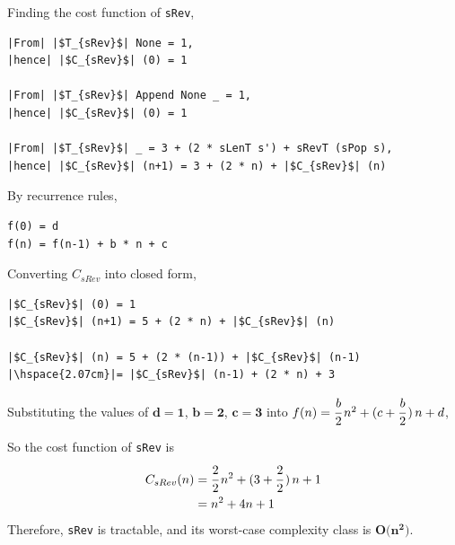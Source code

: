 \documentclass[12pt]{article}
\newcommand{\haskell}{\texttt}
\begin{document}
\bigskip Finding the cost function of \haskell{sRev},
\begin{mdframed}

\begin{verbatim}
|From| |$T_{sRev}$| None = 1, 
|hence| |$C_{sRev}$| (0) = 1

|From| |$T_{sRev}$| Append None _ = 1, 
|hence| |$C_{sRev}$| (0) = 1

|From| |$T_{sRev}$| _ = 3 + (2 * sLenT s') + sRevT (sPop s),
|hence| |$C_{sRev}$| (n+1) = 3 + (2 * n) + |$C_{sRev}$| (n)
\end{verbatim}

\bigskip By recurrence rules,
\begin{verbatim}
f(0) = d
f(n) = f(n-1) + b * n + c
\end{verbatim}

\bigskip Converting $C_{sRev}$ into closed form, 
\begin{verbatim}
|$C_{sRev}$| (0) = 1
|$C_{sRev}$| (n+1) = 5 + (2 * n) + |$C_{sRev}$| (n)

|$C_{sRev}$| (n) = 5 + (2 * (n-1)) + |$C_{sRev}$| (n-1)
|\hspace{2.07cm}|= |$C_{sRev}$| (n-1) + (2 * n) + 3

\end{verbatim}
Substituting the values of $\bm{d = 1}$, $\bm{b = 2}$, $\bm{c = 3}$ into $f(n) = \cfrac{b}{2}\,n^{2} + (c + \cfrac{b}{2}\,)\,n + d$,
\newpage\par\noindent So the cost function of \haskell{sRev} is
\setlength{\abovedisplayskip}{0pt}
\begin{align*}
C_{sRev} (n) &= \cfrac{2}{2}\,n^{2} + (3 + \cfrac{2}{2}\,)\,n + 1 \\
&= n^{2} + 4n + 1
\end{align*}
Therefore, \haskell{sRev} is tractable, and its worst-case complexity class is $\bm{O(n^{2}})$.
\end{mdframed}
\end{document}
